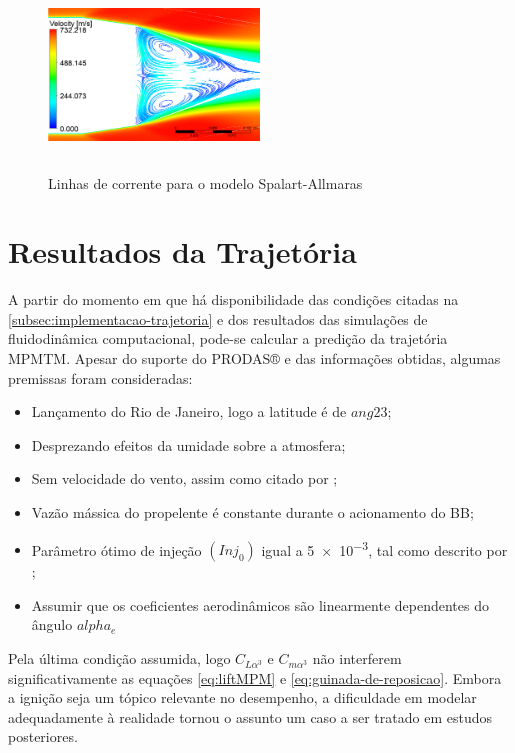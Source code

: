 \begin{figure}[!ht]
    \centering
    \includegraphics[height=5cm,width=0.5\textwidth]{corrente-velocidade-SPALART-2pol.png}
 	\caption{Linhas de corrente para o modelo Spalart-Allmaras}
    \label{fig:corrente-velocidade-bb-RANS}
\end{figure}

\section{Resultados da Trajetória}\label{sec:resultados-trajetoria}

A partir do momento em que há disponibilidade das condições citadas na \autoref{subsec:implementacao-trajetoria} e dos resultados das simulações de fluidodinâmica computacional, pode-se calcular a predição da trajetória MPMTM. Apesar do suporte do PRODAS® e das informações obtidas, algumas premissas foram consideradas:

\begin{itemize}
    \item Lançamento do Rio de Janeiro, logo a latitude é de \(ang{23}\);
    \item Desprezando efeitos da umidade sobre a atmosfera;
    \item Sem velocidade do vento, assim como citado por \citeauthor{Rosendo2020};
    \item Vazão mássica do propelente é constante durante o acionamento do BB;
    \item Parâmetro ótimo de injeção \(\left(Inj_{0}\right)\) igual a \num{5e-3}, tal como descrito por \citeauthor{DAVENAS1993329};
    \item Assumir que os coeficientes aerodinâmicos são linearmente dependentes do ângulo \(alpha_{e}\)
\end{itemize}

Pela última condição assumida, logo \(C_{L\alpha^{3}}\) e \(C_{m\alpha^{3}}\) não interferem significativamente as equações \ref{eq:liftMPM} e \ref{eq:guinada-de-reposicao}. Embora a ignição seja um tópico relevante no desempenho, a dificuldade em modelar adequadamente à realidade tornou o assunto um caso a ser tratado em estudos posteriores.

